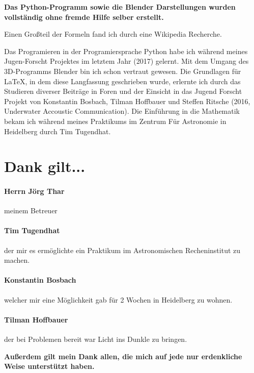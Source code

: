 \begin{center}
 \textbf{
  Das Python-Programm sowie die Blender Darstellungen wurden vollständig ohne fremde Hilfe selber erstellt.
 }
\end{center}
\par Einen Großteil der Formeln fand ich durch eine Wikipedia Recherche.
\par Das Programieren in der Programiersprache Python habe ich während meines Jugen-Forscht Projektes im letztem Jahr (2017) gelernt. Mit dem Umgang des 3D-Programms Blender
bin ich schon vertraut gewesen. Die Grundlagen für \LaTeX, in dem diese Langfassung geschrieben wurde, erlernte ich durch das Studieren diverser Beiträge in Foren und der Einsicht
in das Jugend Forscht Projekt von Konstantin Bosbach, Tilman Hoffbauer und Steffen Ritsche (2016, Underwater Accoustic Communication).
Die Einführung in die Mathematik bekam ich während meines Praktikums im Zentrum Für Astronomie in Heidelberg durch Tim Tugendhat.
\raggedleft
\section*{Dank gilt...}
\paragraph{Herrn Jörg Thar} meinem Betreuer
\paragraph{Tim Tugendhat} der mir es ermöglichte ein Praktikum im Astronomischen Recheninstitut zu machen.
\paragraph{Konstantin Bosbach} welcher mir eine Möglichkeit gab für 2 Wochen in Heidelberg zu wohnen.
\paragraph{Tilman Hoffbauer} der bei Problemen bereit war Licht ins Dunkle zu bringen.


\centering
\vspace{0.5cm} \textbf{Außerdem gilt mein Dank allen, die mich auf jede nur erdenkliche Weise unterstützt haben.}
